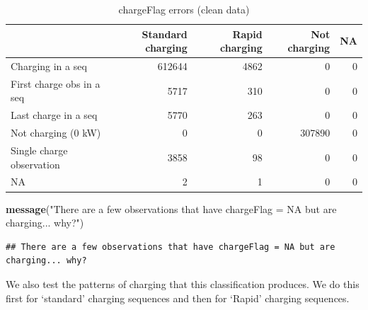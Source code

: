 \documentclass[]{article}
\newenvironment{Shaded}{\begin{snugshade}}{\end{snugshade}}
\newcommand{\KeywordTok}[1]{\textcolor[rgb]{0.13,0.29,0.53}{\textbf{#1}}}
\newcommand{\NormalTok}[1]{#1}
\newcommand{\StringTok}[1]{\textcolor[rgb]{0.31,0.60,0.02}{#1}}
\begin{document}
\begin{table}[t]

\caption{\label{tab:checkChargeFlags}chargeFlag errors (clean data)}
\centering
\begin{tabular}{l|r|r|r|r}
\hline
  & Standard charging & Rapid charging & Not charging & NA\\
\hline
Charging in a seq & 612644 & 4862 & 0 & 0\\
\hline
First charge obs in a seq & 5717 & 310 & 0 & 0\\
\hline
Last charge in a seq & 5770 & 263 & 0 & 0\\
\hline
Not charging (0 kW) & 0 & 0 & 307890 & 0\\
\hline
Single charge observation & 3858 & 98 & 0 & 0\\
\hline
NA & 2 & 1 & 0 & 0\\
\hline
\end{tabular}
\end{table}

\begin{Shaded}
\begin{Highlighting}[]
\KeywordTok{message}\NormalTok{(}\StringTok{"There are a few observations that have chargeFlag = NA but are charging... why?"}\NormalTok{)}
\end{Highlighting}
\end{Shaded}

\begin{verbatim}
## There are a few observations that have chargeFlag = NA but are charging... why?
\end{verbatim}

We also test the patterns of charging that this classification produces. We do this first for `standard' charging sequences and then for `Rapid' charging sequences.
\end{document}
